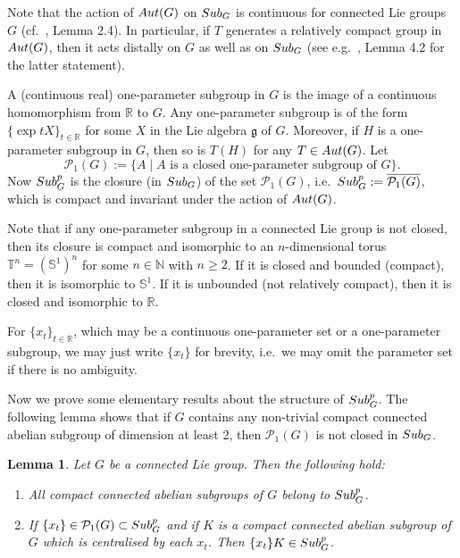 \documentclass{amsart}
\numberwithin{equation}{section}
\newcommand{\Aut}{{\rm Aut}}
\newcommand{\Sub}{{\rm Sub}}
\newcommand{\mbb}{\mathbb}
\newcommand{\N}{{\mathbb N}}
\newcommand{\R}{{\mathbb R}}
\newcommand{\gf}{{\mathfrak g}}
\newcommand{\spg}{{\rm Sub}^p_G}
\let\ol=\overline
\newtheorem{lem}[thm]{Lemma}
\theoremstyle{remark}
\newcommand{\cP}{{\mathcal{P}}}
\begin{document}
Note that the action of $\Aut(G)$ on $\Sub_G$ is continuous for connected Lie groups $G$ (cf.\ \cite{SY3}, Lemma 2.4). 
In particular, if $T$ generates a relatively compact group in $\Aut(G)$, then it acts distally on $G$ 
as well as on $\Sub_G$ (see e.g.\ \cite{PaS}, Lemma 4.2 for the latter statement). 

A (continuous real) one-parameter subgroup in $G$ is the image of a continuous 
homomorphism from $\mathbb{R}$ to $G$. Any one-parameter subgroup is 
of the form $\{\exp tX\}_{t\in\R}$ for some $X$ in the Lie algebra $\gf$ of $G$. Moreover, if $H$ is a one-parameter 
subgroup in $G$, then so is $T(H)$ for any $T\in\Aut(G)$. Let 
$$
\cP_1(G):= \{ A \mid A  \mbox{ is a closed one-parameter subgroup of } G \}.$$ 
Now $\spg$ is the closure (in $\Sub_G$) of the set $\cP_1(G)$, i.e.\ 
$\spg : = \ol{\cP_1(G)}$, which is  compact and invariant under the action of $\Aut(G)$. 

Note that if any one-parameter subgroup in a connected Lie group is not closed, then its closure is compact 
and isomorphic to an $n$-dimensional torus $\mbb{T}^n=(\mbb{S}^1)^n$ for some $n\in\N$ with $n\geq 2$. 
If it is closed and bounded (compact), then it is isomorphic to 
$\mbb{S}^1$. If it is unbounded (not relatively compact), then it is closed and isomorphic to $\R$. 

For $\{x_t\}_{t\in\R}$, which may be a continuous one-parameter set or a one-parameter subgroup, we may just write 
$\{x_t\}$ for brevity, i.e.\ we may omit the parameter set if there is no ambiguity.

Now we prove some elementary results about the structure of $\spg$. The following lemma shows that if $G$ contains 
any non-trivial compact connected abelian subgroup of   
dimension at least 2, then $\cP_1(G)$ is not closed in $\Sub_G$. 

\begin{lem} \label{subpg}
Let $G$ be a connected Lie group. Then the following hold: 
\begin{enumerate}
\item All compact connected abelian subgroups of $G$ belong to $\spg$.
\item If $\{x_t\}\in\cP_1(G)\subset\spg$ and if $K$ is a compact connected abelian subgroup of $G$ 
which is centralised by each $x_t$. 
Then $\{x_t\}K\in\spg$.
\end{enumerate}
\end{lem}
\end{document}
